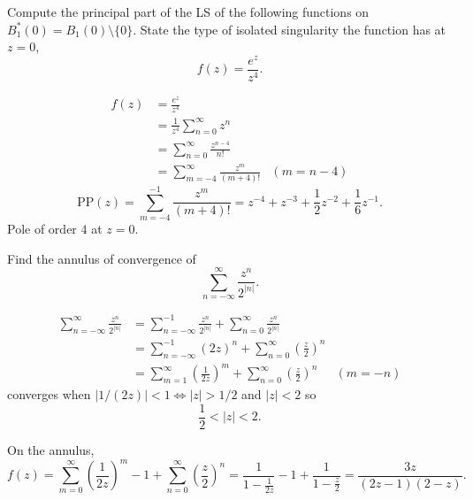 \documentclass[10pt, a4paper]{article}
\begin{document}
\begin{problem}
    Compute the principal part of the LS of the following functions on $B_{1}^{*}(0) = B_1(0) \setminus \{0\}$.
    State the type of isolated singularity the function has at $z = 0$,
    \[
    f(z) = \frac{e ^ z}{z ^ 4}.
    \]

    \begin{solution}
        \begin{align*}
            f(z) &= \frac{e ^ z}{z ^ 4} \\
            &= \frac{1}{z ^ 4}\sum_{n = 0}^{\infty}z ^ n \\
            &= \sum_{n = 0}^{\infty}\frac{z ^ {n - 4}}{n!} \\
            &= \sum_{m = -4}^{\infty}\frac{z ^ m}{(m + 4)!} &(m = n - 4)
        \end{align*}
        \[
        \mathrm{PP}(z) = \sum_{m = -4}^{-1}\frac{z ^ m}{(m + 4)!} = z ^ {-4} + z ^ {-3} + \frac{1}{2}z ^ {-2} + \frac{1}{6}z ^ {-1}.
        \]
        Pole of order $4$ at $z = 0$.
    \end{solution}
\end{problem}

\begin{problem}
    Find the annulus of convergence of
    \[
    \sum_{n = -\infty}^{\infty}\frac{z ^ n}{2 ^ {|n|}}.
    \]

    \begin{solution}
        \begin{align*}
            \sum_{n = -\infty}^{\infty}\frac{z ^ n}{2 ^ {|n|}} &= \sum_{n = -\infty}^{-1}\frac{z ^ n}{2 ^ {|n|}} + \sum_{n = 0}^{\infty}\frac{z ^ n}{2 ^ {|n|}} \\
            &= \sum_{n = -\infty}^{-1}(2z) ^ n + \sum_{n = 0}^{\infty}\left(\frac{z}{2}\right) ^ n \\
            &= \sum_{m = 1}^{\infty}\left(\frac{1}{2z}\right) ^ m + \sum_{n = 0}^{\infty}\left(\frac{z}{2}\right) ^ n &(m = -n)
        \end{align*}
        converges when $|1 / (2z)| < 1 \iff |z| > 1 / 2$ and $|z| < 2$ so
        \[
        \frac{1}{2} < |z| < 2.
        \]

        On the annulus,
        \[
        f(z) = \sum_{m = 0}^{\infty}\left(\frac{1}{2z}\right) ^ m - 1 + \sum_{n = 0}^{\infty}\left(\frac{z}{2}\right) ^ n = \frac{1}{1 - \frac{1}{2z}} - 1 + \frac{1}{1 - \frac{z}{2}} = \frac{3z}{(2z - 1)(2 - z)}.
        \]
    \end{solution}
\end{problem}
\end{document}
